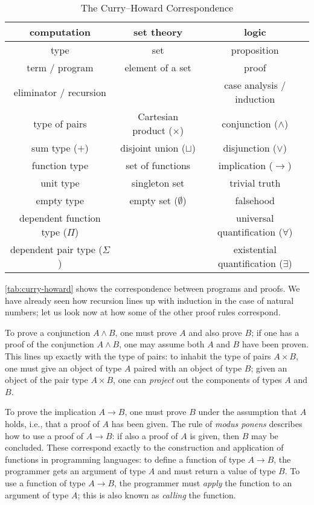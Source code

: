\begin{table}[t]
\centering
\begin{tabular}{c|c|c}
computation & set theory & logic \\ \hline
type & set & proposition \\
term / program & element of a set & proof \\
eliminator / recursion & & case analysis / induction \\
type of pairs & Cartesian product ($\times$) & conjunction ($\wedge$) \\
sum type ($+$) & disjoint union ($\sqcup$) & disjunction ($\vee$) \\
function type & set of functions & implication ($\to$) \\
unit type & singleton set & trivial truth \\
empty type & empty set ($\emptyset$) & falsehood \\
dependent function type ($\Pi$) & & universal quantification ($\forall$) \\
dependent pair type ($\Sigma$) & & existential quantification ($\exists$)
\end{tabular}
\caption{The Curry--Howard Correspondence}
\label{tab:curry-howard}
\end{table}

\autoref{tab:curry-howard} shows the correspondence between programs and proofs.
We have already seen how recursion lines up with induction in the case of natural numbers; let us look now at how some of the other proof rules correspond.

To prove a conjunction $A \wedge B$, one must prove $A$ and also prove $B$; if one has a proof of the conjunction $A \wedge B$, one may assume both $A$ and $B$ have been proven.
This lines up exactly with the type of pairs: to inhabit the type of pairs $A \times B$, one must give an object of type $A$ paired with an object of type $B$; given an object of the pair type $A \times B$, one can \emph{project} out the components of types $A$ and $B$.

To prove the implication $A \to B$, one must prove $B$ under the assumption that $A$ holds, i.e., that a proof of $A$ has been given.
The rule of \emph{modus ponens} describes how to use a proof of $A \to B$: if also a proof of $A$ is given, then $B$ may be concluded.
These correspond exactly to the construction and application of functions in programming languages:
to define a function of type $A \to B$, the programmer gets an argument of type $A$ and must return a value of type $B$.
To use a function of type $A \to B$, the programmer must \emph{apply} the function to an argument of type $A$; this is also known as \emph{calling} the function.

